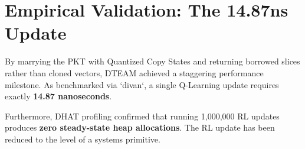 \section{Empirical Validation: The 14.87ns Update}
By marrying the PKT with Quantized Copy States and returning borrowed slices rather than cloned vectors, DTEAM achieved a staggering performance milestone. As benchmarked via `divan`, a single Q-Learning update requires exactly \textbf{14.87 nanoseconds}. 

Furthermore, DHAT profiling confirmed that running 1,000,000 RL updates produces \textbf{zero steady-state heap allocations}. The RL update has been reduced to the level of a systems primitive.
